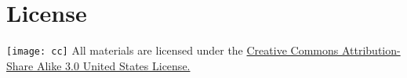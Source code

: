 \chapter*{License}


\noindent
\texttt{[image: cc]} All materials are licensed under the \href{http://creativecommons.org/licenses/by-sa/3.0/us/}{Creative Commons Attribution-Share Alike 3.0 United States License.}
